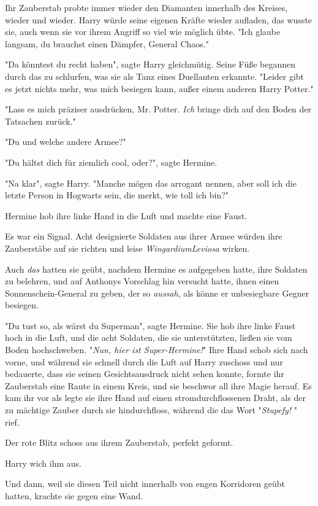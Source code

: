 {Ihr Zauberstab probte immer wieder den Diamanten innerhalb des Kreises, wieder und wieder. Harry würde seine eigenen Kräfte wieder aufladen, das wusste sie, auch wenn sie vor ihrem Angriff so viel wie möglich übte. "Ich glaube langsam, du brauchst einen Dämpfer, General Chaos."

"Da könntest du recht haben", sagte Harry gleichmütig. Seine Füße begannen durch das zu schlurfen, was sie als Tanz eines Duellanten erkannte. "Leider gibt es jetzt nichts mehr, was mich besiegen kann, außer einem anderen Harry Potter."

"Lass es mich präziser ausdrücken, Mr. Potter. \emph{Ich} bringe dich auf den Boden der Tatsachen zurück."

"Du und welche andere Armee?"

"Du hältst dich für ziemlich cool, oder?", sagte Hermine.

"Na klar", sagte Harry. "Manche mögen das arrogant nennen, aber soll ich die letzte Person in Hogwarts sein, die merkt, wie toll ich bin?"

Hermine hob ihre linke Hand in die Luft und machte eine Faust.

Es war ein Signal. Acht designierte Soldaten aus ihrer Armee würden ihre Zauberstäbe auf sie richten und leise \emph{WingardiumLeviosa} wirken.

Auch \emph{das} hatten sie geübt, nachdem Hermine es aufgegeben hatte, ihre Soldaten zu belehren, und auf Anthonys Vorschlag hin versucht hatte, ihnen einen Sonnenschein-General zu geben, der so \emph{aussah}, als könne er unbesiegbare Gegner besiegen.

"Du tust so, als wärst du Superman", sagte Hermine. Sie hob ihre linke Faust hoch in die Luft, und die acht Soldaten, die sie unterstützten, ließen sie vom Boden hochschweben. "\emph{Nun, hier ist Super-Hermine!}" Ihre Hand schob sich nach vorne, und während sie schnell durch die Luft auf Harry zuschoss und nur bedauerte, dass sie seinen Gesichtsausdruck nicht sehen konnte, formte ihr Zauberstab eine Raute in einem Kreis, und sie beschwor all ihre Magie herauf. Es kam ihr vor als legte sie ihre Hand auf einen stromdurchflossenen Draht, als der zu mächtige Zauber durch sie hindurchfloss, während die das Wort "\emph{Stupefy!} " rief.

Der rote Blitz schoss aus ihrem Zauberstab, perfekt geformt.

Harry wich ihm aus.

Und dann, weil sie diesen Teil nicht innerhalb von engen Korridoren geübt hatten, krachte sie gegen eine Wand.

}
